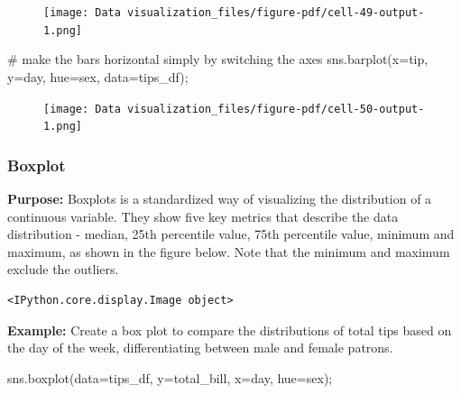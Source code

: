 \documentclass[
  letterpaper,
  DIV=11,
  numbers=noendperiod]{scrreprt}
\newenvironment{Shaded}{\begin{snugshade}}{\end{snugshade}}
\newcommand{\CommentTok}[1]{\textcolor[rgb]{0.37,0.37,0.37}{#1}}
\newcommand{\NormalTok}[1]{\textcolor[rgb]{0.00,0.23,0.31}{#1}}
\newcommand{\OperatorTok}[1]{\textcolor[rgb]{0.37,0.37,0.37}{#1}}
\newcommand{\StringTok}[1]{\textcolor[rgb]{0.13,0.47,0.30}{#1}}
\begin{document}
\begin{figure}[H]

{\centering \texttt{[image: Data visualization\_files/figure-pdf/cell-49-output-1.png]}

}

\end{figure}

\begin{Shaded}
\begin{Highlighting}[]
\CommentTok{\# make the bars horizontal simply by switching the axes}
\NormalTok{sns.barplot(x}\OperatorTok{=}\StringTok{\textquotesingle{}tip\textquotesingle{}}\NormalTok{, y}\OperatorTok{=}\StringTok{\textquotesingle{}day\textquotesingle{}}\NormalTok{, hue}\OperatorTok{=}\StringTok{\textquotesingle{}sex\textquotesingle{}}\NormalTok{, data}\OperatorTok{=}\NormalTok{tips\_df)}\OperatorTok{;}
\end{Highlighting}
\end{Shaded}

\begin{figure}[H]

{\centering \texttt{[image: Data visualization\_files/figure-pdf/cell-50-output-1.png]}

}

\end{figure}

\hypertarget{boxplot}{%
\subsubsection{Boxplot}\label{boxplot}}

\textbf{Purpose:} Boxplots is a standardized way of visualizing the
distribution of a continuous variable. They show five key metrics that
describe the data distribution - median, 25th percentile value, 75th
percentile value, minimum and maximum, as shown in the figure below.
Note that the minimum and maximum exclude the outliers.

\begin{verbatim}
<IPython.core.display.Image object>
\end{verbatim}

\textbf{Example:} Create a box plot to compare the distributions of
total tips based on the day of the week, differentiating between male
and female patrons.

\begin{Shaded}
\begin{Highlighting}[]
\NormalTok{sns.boxplot(data}\OperatorTok{=}\NormalTok{tips\_df, y}\OperatorTok{=}\StringTok{\textquotesingle{}total\_bill\textquotesingle{}}\NormalTok{, x}\OperatorTok{=}\StringTok{\textquotesingle{}day\textquotesingle{}}\NormalTok{, hue}\OperatorTok{=}\StringTok{\textquotesingle{}sex\textquotesingle{}}\NormalTok{)}\OperatorTok{;}
\end{Highlighting}
\end{Shaded}
\end{document}
